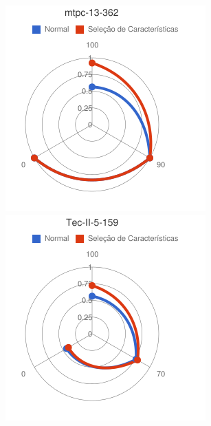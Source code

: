 \begin{figure}
\begin{minipage}{.3\textwidth}
\end{minipage} %
\begin{minipage}{.3\textwidth}
  \centering
  \includegraphics[width=\linewidth]{img/red-ufes-moodle/image3.png}
\end{minipage}
\begin{minipage}{.3\textwidth}
  \centering
  \includegraphics[width=\linewidth]{img/red-ufes-moodle/image4.png}

\end{minipage}
\end{figure}

